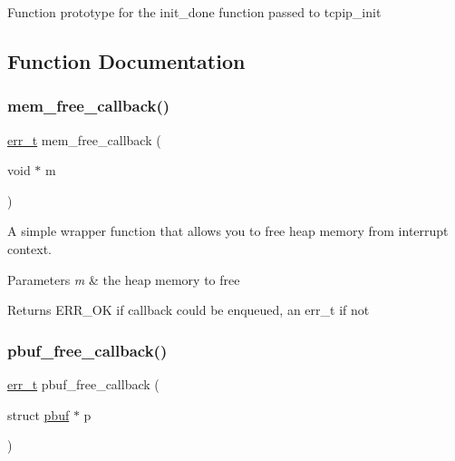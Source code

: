 Function prototype for the init\+\_\+done function passed to tcpip\+\_\+init 

\subsection{Function Documentation}
\mbox{\label{openmote-cc2538_2lwip_2src_2include_2lwip_2tcpip_8h_a55b4de3765c6a37b3f2b26a11603771c}} 
\subsubsection{\texorpdfstring{mem\+\_\+free\+\_\+callback()}{mem\_free\_callback()}}
{\footnotesize\ttfamily \hyperlink{group__infrastructure__errors_gaf02d9da80fd66b4f986d2c53d7231ddb}{err\+\_\+t} mem\+\_\+free\+\_\+callback (\begin{DoxyParamCaption}\item[{void $\ast$}]{m }\end{DoxyParamCaption})}

A simple wrapper function that allows you to free heap memory from interrupt context.


\begin{DoxyParams}{Parameters}
{\em m} & the heap memory to free \\
\hline
\end{DoxyParams}
\begin{DoxyReturn}{Returns}
E\+R\+R\+\_\+\+OK if callback could be enqueued, an err\+\_\+t if not 
\end{DoxyReturn}
\mbox{\label{openmote-cc2538_2lwip_2src_2include_2lwip_2tcpip_8h_a5cdcb6b784fe0e8736a5b31a5cfbed6c}} 
\subsubsection{\texorpdfstring{pbuf\+\_\+free\+\_\+callback()}{pbuf\_free\_callback()}}
{\footnotesize\ttfamily \hyperlink{group__infrastructure__errors_gaf02d9da80fd66b4f986d2c53d7231ddb}{err\+\_\+t} pbuf\+\_\+free\+\_\+callback (\begin{DoxyParamCaption}\item[{struct \hyperlink{structpbuf}{pbuf} $\ast$}]{p }\end{DoxyParamCaption})}

